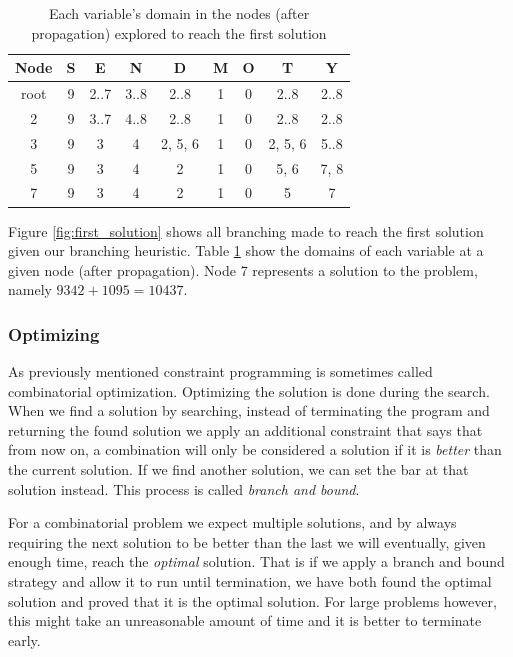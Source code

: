 \begin{table}
	\centering
	\begin{tabular}{c|c|c|c|c|c|c|c|c}
		Node & S & E & N & D & M & O & T & Y \\
		\hline
		root & 9 & {2..7} & {3..8} & {2..8} & 1 & 0 & {2..8} & {2..8} \\
		2 & 9 & {3..7} & {4..8} & {2..8} & 1 & 0 & {2..8} & {2..8} \\
		3 & 9 & 3 & 4 & {2, 5, 6} & 1 & 0 & {2, 5, 6} & {5..8} \\
		5 & 9 & 3 & 4 & 2 & 1 & 0 & {5, 6} & {7, 8} \\
		7 & 9 & 3 & 4 & 2 & 1 & 0 & 5 & 7 \\
	\end{tabular}
	\caption{Each variable's domain in the nodes (after propagation) explored to reach the first solution}
	\label{tab:first_solution_states}
\end{table}

Figure \ref{fig:first_solution} shows all branching made to reach the first solution given
our branching heuristic. Table \ref{tab:first_solution_states} show the domains of each
variable at a given node (after propagation). Node 7 represents a solution to the problem,
namely $9342+1095=10437$.

\subsubsection{Optimizing}
\label{sec:optimizing}

As previously mentioned constraint programming is sometimes called combinatorial optimization.
Optimizing the solution is done during the search. When we find a solution by searching,
instead of terminating the program and returning the found solution we apply an additional
constraint that says that from now on, a combination will only be considered a solution
if it is \textit{better} than the current solution. If we find another solution, we can
set the bar at that solution instead. This process is called \textit{branch and bound}.

For a combinatorial problem we expect multiple solutions, and by always requiring the
next solution to be better than the last we will eventually, given enough time, reach
the \textit{optimal} solution. That is if we apply a branch and bound strategy and allow
it to run until termination, we have both found the optimal solution and proved that it is
the optimal solution. For large problems however, this might take an unreasonable amount
of time and it is better to terminate early.

